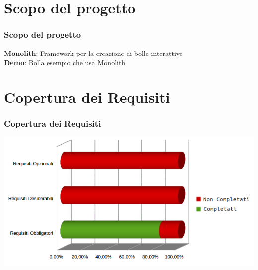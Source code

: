\section{Scopo del progetto}
\begin{frame}
	\frametitle{Scopo del progetto}
	\begin{center}
	\begin{large}
		\textbf{Monolith}: Framework per la creazione di bolle interattive \\
		\vspace{1cm}
		\textbf{Demo}: Bolla esempio che usa Monolith
	\end{large}
	\end{center}
	
\end{frame}

\section{Copertura dei Requisiti}
\begin{frame}
	\frametitle{Copertura dei Requisiti}
	\includegraphics[scale=0.50]{img/Requisiti.png}
	
\end{frame}


